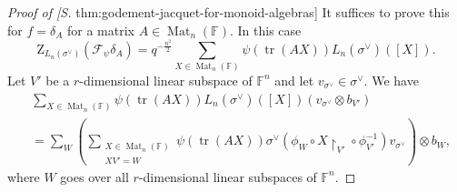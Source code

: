 \documentclass[12pt, reqno]{amsart}
\theoremstyle{definition}
\newcommand{\Cref}[1]{\zcref[S]{#1}}
\newcommand{\zetaIntegral}{\mathrm{Z}}
\newcommand{\fieldCharacter}{\psi}
\newcommand{\trace}{\operatorname{tr}}
\newcommand{\finiteField}{\mathbb{F}}
\newcommand{\squareMatrix}{\operatorname{Mat}}
\newcommand{\fourierTransform}[1]{\mathcal{F}_{#1}}
\begin{document}
	\begin{proof}[Proof of \Cref{thm:godement-jacquet-for-monoid-algebras}]
		It suffices to prove this for $f = \delta_{A}$ for a matrix $A \in \squareMatrix_n\left(\finiteField\right)$. In this case 
		\begin{displaymath}
			\zetaIntegral_{L_n\left(\sigma^{\vee}\right)}\left(\fourierTransform{\fieldCharacter}\delta_A\right) = q^{-\frac{n^2}{2}} \sum_{X \in \squareMatrix_n\left(\finiteField\right)} \fieldCharacter\left(\trace\left(AX\right)\right) L_n\left(\sigma^{\vee}\right)\left(\left[X\right]\right).
		\end{displaymath}
		Let $V'$ be a $r$-dimensional linear subspace of $\finiteField^n$ and let $v_{\sigma^{\vee}} \in \sigma^{\vee}$. We have
		\begin{equation*}
			\begin{split}
				&\sum_{X \in \squareMatrix_n\left(\finiteField\right)} \fieldCharacter\left(\trace\left(AX\right)\right) L_n\left(\sigma^{\vee}\right)\left(\left[X\right]\right)\left(v_{\sigma^{\vee}} \otimes b_{V'}\right) \\
				&= \sum_{W}  \left(\sum_{\substack{X \in \squareMatrix_n\left(\finiteField\right)\\
						X V' = W}} \fieldCharacter\left(\trace\left(AX\right)\right) \sigma^{\vee}\left(\phi_W \circ X \restriction_{V'} \circ \phi_{V'}^{-1}\right)v_{\sigma^{\vee}} \right) \otimes b_W,
			\end{split}
		\end{equation*}
		where $W$ goes over all $r$-dimensional linear subspaces of $\finiteField^n$.
		

\end{proof}
\end{document}
